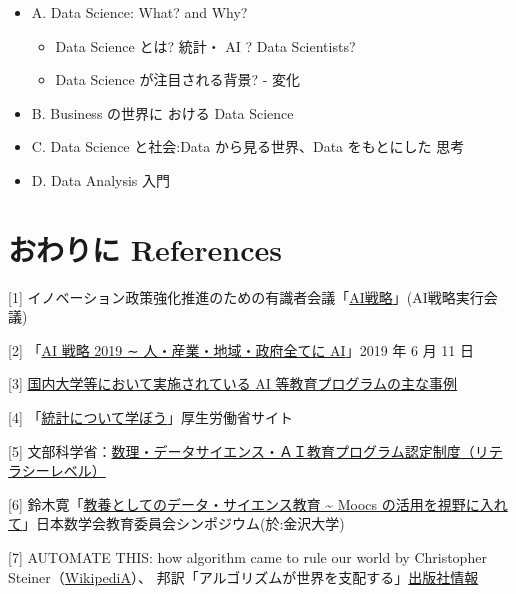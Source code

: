 \documentclass[
]{book}
\providecommand{\tightlist}{%
  \setlength{\itemsep}{0pt}\setlength{\parskip}{0pt}}
\theoremstyle{definition}
\theoremstyle{definition}
\theoremstyle{definition}
\theoremstyle{definition}
\theoremstyle{remark}
\begin{document}
\begin{itemize}
\tightlist
\item
  A. Data Science: What? and Why?

  \begin{itemize}
  \tightlist
  \item
    Data Science とは? 統計・ AI ? Data Scientists?
  \item
    Data Science が注目される背景? - 変化
  \end{itemize}
\item
  B. Business の世界に おける Data Science
\item
  C. Data Science と社会:Data から見る世界、Data をもとにした 思考
\item
  D. Data Analysis 入門
\end{itemize}

\hypertarget{ux304aux308fux308aux306b-references}{%
\section{おわりに References}\label{ux304aux308fux308aux306b-references}}

{[}1{]} イノベーション政策強化推進のための有識者会議「\href{https://www8.cao.go.jp/cstp/ai/index.html}{AI戦略}」(AI戦略実行会議)

{[}2{]} 「\href{https://www5.cao.go.jp/keizai-shimon/kaigi/special/reform/wg7/20191101/shiryou1.pdf}{AI 戦略 2019 ∼ 人・産業・地域・政府全てに AI}」2019 年 6 月 11 日

{[}3{]} \href{https://www8.cao.go.jp/cstp/ai/suuri/r1_1kai/r1_1kai.html}{国内大学等において実施されている AI 等教育プログラムの主な事例}

{[}4{]} 「\href{https://www.mhlw.go.jp/toukei/learning/index.html}{統計について学ぼう}」厚生労働省サイト

{[}5{]} 文部科学省：\href{https://www.mext.go.jp/a_menu/koutou/suuri_datascience_ai/00002.htm}{数理・データサイエンス・ＡＩ教育プログラム認定制度（リテラシーレベル）}

{[}6{]} 鈴木寛「\href{https://icu-hsuzuki.github.io/science/index-j.html\#msj2019}{教養としてのデータ・サイエンス教育 \textasciitilde{} Moocs の活用を視野に入れて}」日本数学会教育委員会シンポジウム(於:金沢大学)

{[}7{]} AUTOMATE THIS: how algorithm came to rule our world by Christopher Steiner（\href{https://en.wikipedia.org/wiki/Automate_This}{WikipediA}）、 邦訳「アルゴリズムが世界を支配する」\href{https://www.kadokawa.co.jp/product/321306000181/}{出版社情報}
\end{document}
